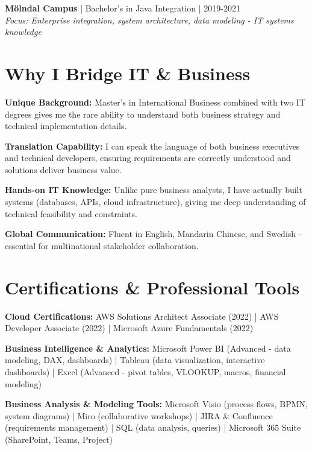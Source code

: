 \documentclass[10pt,a4paper]{article}
\begin{document}
\textbf{Mölndal Campus} | Bachelor's in Java Integration | 2019-2021\\
\textit{Focus: Enterprise integration, system architecture, data modeling - IT systems knowledge}

\section*{Why I Bridge IT \& Business}

\textbf{Unique Background:} Master's in International Business combined with two IT degrees gives me the rare ability to understand both business strategy and technical implementation details.

\textbf{Translation Capability:} I can speak the language of both business executives and technical developers, ensuring requirements are correctly understood and solutions deliver business value.

\textbf{Hands-on IT Knowledge:} Unlike pure business analysts, I have actually built systems (databases, APIs, cloud infrastructure), giving me deep understanding of technical feasibility and constraints.

\textbf{Global Communication:} Fluent in English, Mandarin Chinese, and Swedish - essential for multinational stakeholder collaboration.

\section*{Certifications \& Professional Tools}

\textbf{Cloud Certifications:} AWS Solutions Architect Associate (2022) | AWS Developer Associate (2022) | Microsoft Azure Fundamentals (2022)

\textbf{Business Intelligence \& Analytics:} Microsoft Power BI (Advanced - data modeling, DAX, dashboards) | Tableau (data visualization, interactive dashboards) | Excel (Advanced - pivot tables, VLOOKUP, macros, financial modeling)

\textbf{Business Analysis \& Modeling Tools:} Microsoft Visio (process flows, BPMN, system diagrams) | Miro (collaborative workshops) | JIRA \& Confluence (requirements management) | SQL (data analysis, queries) | Microsoft 365 Suite (SharePoint, Teams, Project)
\end{document}
